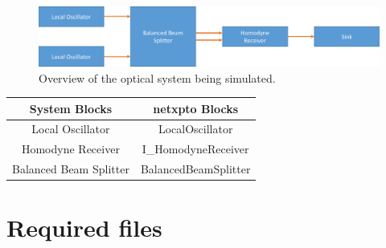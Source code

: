 \documentclass[a4paper]{article}
\begin{document}
\begin{figure}[h]
\centering
\includegraphics[width=\linewidth]{singlehomodyneSimuBlock.png}
\caption{Overview of the optical system being simulated.}
\label{fig:singleH}
\end{figure}

\begin{table}[H]
\centering
\begin{tabular}{c|c}
System Blocks          & netxpto Blocks       \\ \hline
Local Oscillator       & LocalOscillator      \\
Homodyne Receiver      & I\_HomodyneReceiver   \\
Balanced Beam Splitter & BalancedBeamSplitter
\end{tabular}
\end{table}

\section{Required files}\label{Required files}
\end{document}
